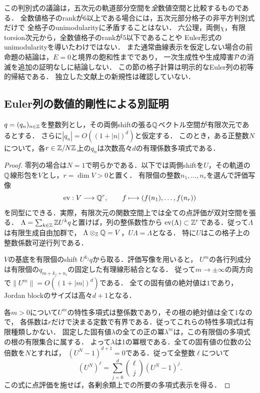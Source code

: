 \documentclass[11pt,a4paper]{ltjsarticle}
\begin{document}
\begin{remark}[適用範囲と残る問題]
この判別式の議論は，五次元の軌道部分空間を\emph{全}数値空間と比較するものである．
全数値格子のrankが$6$以上である場合には，五次元部分格子の非平方判別式だけで
全格子のunimodularityに矛盾することはない．
六公理，両側$\chi$，有限torsion次元から，全数値格子のrankが$5$以下であることや
Euler形式のunimodularityを導いたわけではない．
また通常曲線表示を仮定しない場合の前命題の結論は，$E=0$と境界の飽和性までであり，
一次生成性や生成障害$\mathcal P$の消滅を追加の証明なしに結論しない．
この節の格子計算は明示的なEuler列の初等的帰結である．
独立した文献上の新規性は確認していない．
\end{remark}

\subsection{Euler列の数値的剛性による別証明}

\begin{lemma}[整係数の有限rank軌道と準多項式]\label{lem:v7-integral-recurrence}
$q=(q_n)_{n\in\mathbb Z}$を整数列とし，その両側shiftの張る$\mathbb Q$ベクトル空間が有限次元であるとする．
さらに$|q_n|=O((1+|n|)^d)$と仮定する．
このとき，ある正整数$N$について，各$r\in\mathbb Z/N\mathbb Z$上の$q_n$は次数高々$d$の有理係数多項式である．
\end{lemma}
\begin{proof}
零列の場合は$N=1$で明らかである．以下では両側shiftを$U$，その軌道の$\mathbb Q$線形包を$V$とし，$r=\dim V>0$と置く．
有限個の整数$n_1,\ldots,n_r$を選んで評価写像
\[
 \operatorname{ev}:V\longrightarrow\mathbb Q^r,
 \qquad f\longmapsto(f(n_1),\ldots,f(n_r))
\]
を同型にできる．実際，有限次元の関数空間上では全ての点評価が双対空間を張る．
$\Lambda=\sum_{k\in\mathbb Z}\mathbb Z U^kq$と置けば，列の整係数性から
$\operatorname{ev}(\Lambda)\subset\mathbb Z^r$である．従って$\Lambda$は有限生成自由加群で，
$\Lambda\otimes_\mathbb Z\mathbb Q=V$，$U\Lambda=\Lambda$となる．
特に$U$はこの格子上の整数係数可逆行列である．

$V$の基底を有限個のshift $U^{k_j}q$から取る．評価写像を用いると，
$U^m$の各行列成分は有限個の$q_{m+k_j+n_i}$の固定した有理線形結合となる．
従って$m\to\pm\infty$の両方向で$\|U^m\|=O((1+|m|)^d)$である．
全ての固有値の絶対値は$1$であり，Jordan blockのサイズは高々$d+1$となる．

各$m>0$について$U^m$の特性多項式は整係数であり，その根の絶対値は全て$1$なので，
各係数は$r$だけで決まる定数で有界である．従ってこれらの特性多項式は有限種類しかない．
固定した固有値$\lambda$の全ての正の冪$\lambda^m$は，この有限個の多項式の根の有限集合に属する．
よって$\lambda$は1の冪根である．全ての固有値の位数の公倍数を$N$とすれば，
$(U^N-1)^{d+1}=0$である．従って全整数$\ell$について
\[
 (U^N)^\ell=\sum_{j=0}^d\binom{\ell}{j}(U^N-1)^j.
\]
この式に点評価を施せば，各剰余類上での所要の多項式表示を得る．
\end{proof}
\end{document}
